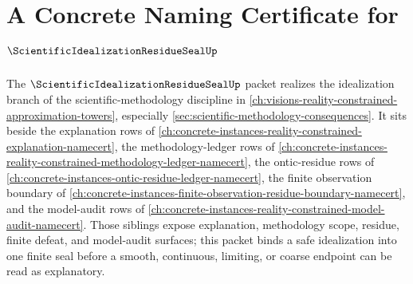 \chapter{A Concrete Naming Certificate for $\ScientificIdealizationResidueSealUp$}
\label{ch:concrete-instances-scientific-idealization-residue-seal-namecert}

The $\ScientificIdealizationResidueSealUp$ packet realizes the idealization branch of the scientific-methodology discipline in \autoref{ch:visions-reality-constrained-approximation-towers}, especially \autoref{sec:scientific-methodology-consequences}. It sits beside the explanation rows of \autoref{ch:concrete-instances-reality-constrained-explanation-namecert}, the methodology-ledger rows of \autoref{ch:concrete-instances-reality-constrained-methodology-ledger-namecert}, the ontic-residue rows of \autoref{ch:concrete-instances-ontic-residue-ledger-namecert}, the finite observation boundary of \autoref{ch:concrete-instances-finite-observation-residue-boundary-namecert}, and the model-audit rows of \autoref{ch:concrete-instances-reality-constrained-model-audit-namecert}. Those siblings expose explanation, methodology scope, residue, finite defeat, and model-audit surfaces; this packet binds a safe idealization into one finite seal before a smooth, continuous, limiting, or coarse endpoint can be read as explanatory.

